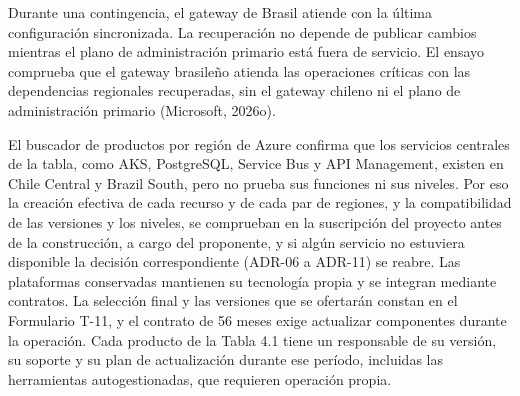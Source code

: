 \documentclass[11pt]{article}
\begin{document}
Durante una contingencia, el gateway de Brasil atiende con la última configuración sincronizada. La recuperación no depende de publicar cambios mientras el plano de administración primario está fuera de servicio. El ensayo comprueba que el gateway brasileño atienda las operaciones críticas con las dependencias regionales recuperadas, sin el gateway chileno ni el plano de administración primario (Microsoft, 2026o).

El buscador de productos por región de Azure confirma que los servicios centrales de la tabla, como AKS, PostgreSQL, Service Bus y API Management, existen en Chile Central y Brazil South, pero no prueba sus funciones ni sus niveles. Por eso la creación efectiva de cada recurso y de cada par de regiones, y la compatibilidad de las versiones y los niveles, se comprueban en la suscripción del proyecto antes de la construcción, a cargo del proponente, y si algún servicio no estuviera disponible la decisión correspondiente (ADR-06 a ADR-11) se reabre. Las plataformas conservadas mantienen su tecnología propia y se integran mediante contratos. La selección final y las versiones que se ofertarán constan en el Formulario T-11, y el contrato de 56 meses exige actualizar componentes durante la operación. Cada producto de la Tabla 4.1 tiene un responsable de su versión, su soporte y su plan de actualización durante ese período, incluidas las herramientas autogestionadas, que requieren operación propia.

\par\vspace{0pt plus 10\baselineskip}\vspace{0pt plus -10\baselineskip}
\end{document}
